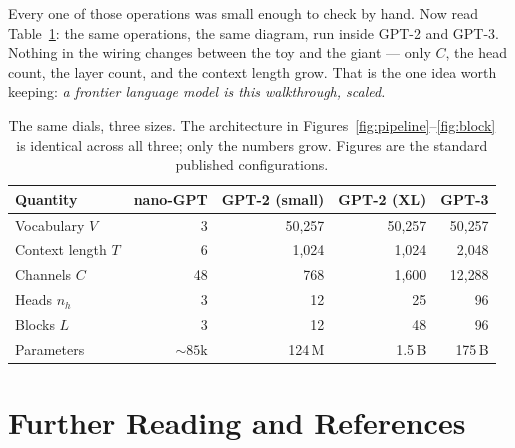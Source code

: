 \documentclass[11pt]{article}
\newcommand{\vocab}{V}                      %
\newcommand{\seqlen}{T}                      %
\newcommand{\dmodel}{C}                      %
\newcommand{\nheads}{n_{h}}                  %
\begin{document}
Every one of those operations was small enough to check by hand. Now read
Table~\ref{tab:scale}: the same operations, the same diagram, run inside GPT-2 and
GPT-3. Nothing in the wiring changes between the toy and the giant --- only
$\dmodel$, the head count, the layer count, and the context length grow. That is
the one idea worth keeping: \emph{a frontier language model is this walkthrough,
scaled.}

\begin{table}[ht]
\centering
\caption{The same dials, three sizes. The architecture in
Figures~\ref{fig:pipeline}--\ref{fig:block} is identical across all three; only the
numbers grow. Figures are the standard published configurations.}
\label{tab:scale}
\renewcommand{\arraystretch}{1.3}
\begin{tabular}{l r r r r}
\toprule
\textbf{Quantity} & \textbf{nano-GPT} & \textbf{GPT-2 (small)} & \textbf{GPT-2 (XL)} & \textbf{GPT-3} \\
\midrule
Vocabulary $\vocab$            & 3      & 50{,}257 & 50{,}257 & 50{,}257 \\
Context length $\seqlen$       & 6      & 1{,}024  & 1{,}024  & 2{,}048  \\
Channels $\dmodel$             & 48     & 768      & 1{,}600  & 12{,}288 \\
Heads $\nheads$                & 3      & 12       & 25       & 96       \\
Blocks $L$                     & 3      & 12       & 48       & 96       \\
Parameters                     & ${\sim}85\text{k}$ & 124\,M & 1.5\,B & 175\,B \\
\bottomrule
\end{tabular}
\end{table}

\newpage
\section{Further Reading and References}
\end{document}
